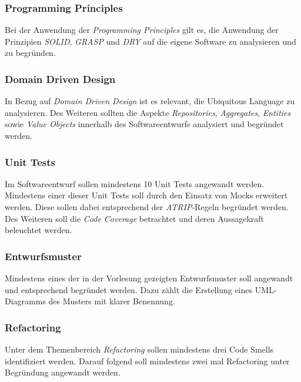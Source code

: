 \subsubsection*{Programming Principles}
Bei der Anwendung der \textit{Programming Principles} gilt es, die Anwendung der Prinzipien \textit{SOLID}, \textit{GRASP} und \textit{DRY} auf die eigene Software zu analysieren und zu begründen. 

\subsubsection*{Domain Driven Design}
In Bezug auf \textit{Domain Driven Design} ist es relevant, die Ubiquitous Language zu analysieren. 
Des Weiteren sollten die Aspekte \textit{Repositories}, \textit{Aggregates}, \textit{Entities} sowie \textit{Value Objects} innerhalb des Softwareentwurfs analysiert und begründet werden.

\subsubsection*{Unit Tests}
Im Softwareentwurf sollen mindestens 10 Unit Tests angewandt werden.
Mindestens einer dieser Unit Tests soll durch den Einsatz von Mocks erweitert werden.
Diese sollen dabei entsprechend der \textit{ATRIP}-Regeln begründet werden.
Des Weiteren soll die \textit{Code Coverage} betrachtet und deren Aussagekraft beleuchtet werden.

\subsubsection*{Entwurfsmuster}
Mindestens eines der in der Vorlesung gezeigten Entwurfsmuster soll angewandt und entsprechend begründet werden.
Dazu zählt die Erstellung eines UML-Diagramms des Musters mit klarer Benennung.

\subsubsection*{Refactoring}
Unter dem Themenbereich \textit{Refactoring} sollen mindestens drei Code Smells identifiziert werden.
Darauf folgend soll mindestens zwei mal Refactoring unter Begründung angewandt werden.



